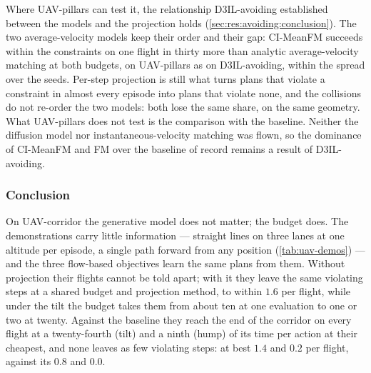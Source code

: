 Where UAV-pillars can test it, the relationship D3IL-avoiding established between the models and the
projection holds (\autoref{sec:res:avoiding:conclusion}). The two average-velocity models keep their order
and their gap: CI-MeanFM succeeds within the constraints on one flight in thirty more than analytic
average-velocity matching at both budgets, on UAV-pillars as on D3IL-avoiding, within the spread over the
seeds. Per-step projection is still what turns plans that violate a constraint in almost every episode into
plans that violate none, and the collisions do not re-order the two models: both lose the same
share, on the same geometry. What UAV-pillars does not test is the comparison with the baseline. Neither
the diffusion model nor instantaneous-velocity matching was flown, so the dominance of CI-MeanFM and FM
over the baseline of record remains a result of D3IL-avoiding.

\subsubsection{Conclusion}\label{sec:res:uav:corridor:conclusion}

On UAV-corridor the generative model does not matter; the budget does. The demonstrations carry little
information --- straight lines on three lanes at one altitude per episode, a single path forward from any
position (\autoref{tab:uav-demos}) --- and the three flow-based objectives learn the same plans from them.
Without projection their flights cannot be told apart; with it they leave the same violating steps at a
shared budget and projection method, to within $1.6$ per flight, while under the tilt the budget takes them
from about ten at one evaluation to one or two at twenty. Against the baseline they reach the end of the
corridor on every flight at a twenty-fourth (tilt) and a ninth (hump) of its time per action at their
cheapest, and none leaves as few violating steps: at best $1.4$ and $0.2$ per flight, against its $0.8$ and
$0.0$.

